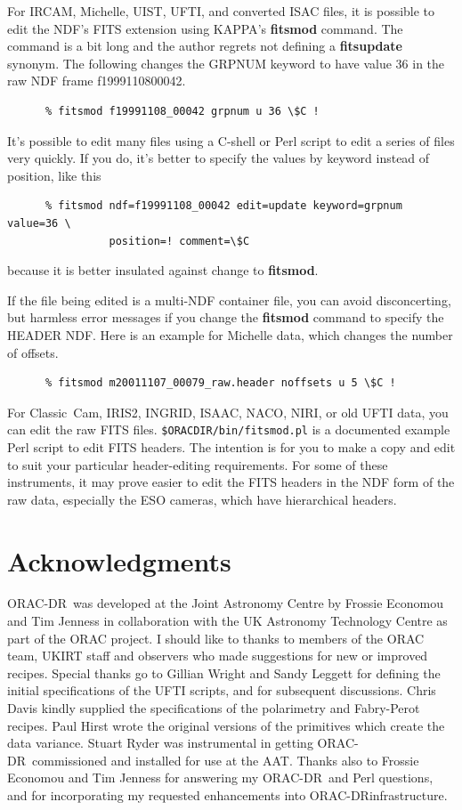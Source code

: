 \documentclass[twoside,11pt]{article}
\newcommand{\xref}[3]{#1}
\renewcommand{\_}{\texttt{\symbol{95}}}
\newcommand{\KAPPA}{{\footnotesize KAPPA}}
\newcommand{\ORACDR}{{\footnotesize ORAC-DR}}
\begin{document}
For IRCAM, Michelle, UIST, UFTI, and converted ISAC files, it is
possible to edit the NDF's
\xref{FITS extension}{sun95}{se_fitsairlock} using \KAPPA's
\xref{{\bf fitsmod}}{sun95}{FITSMOD} command.  The command is a bit
long and the author regrets not defining a {\bf fitsupdate} synonym.
The following changes the GRPNUM keyword to have value 36 in the raw
NDF frame f19991108\_00042.

\begin{verbatim}
      % fitsmod f19991108_00042 grpnum u 36 \$C !
\end{verbatim}

It's possible to edit many files using a \xref{C-shell}{sc4}{} or Perl
script to edit a series of files very quickly.  If you do, it's better
to specify the values by keyword instead of position, like this

\begin{verbatim}
      % fitsmod ndf=f19991108_00042 edit=update keyword=grpnum value=36 \
                position=! comment=\$C
\end{verbatim}
because it is better insulated against change to {\bf fitsmod}.

If the file being edited is a multi-NDF container file, you can avoid
disconcerting, but harmless error messages if you change the {\bf
fitsmod} command to specify the HEADER NDF.  Here is an example for
Michelle data, which changes the number of offsets.

\begin{verbatim}
      % fitsmod m20011107_00079_raw.header noffsets u 5 \$C !
\end{verbatim}

For Classic~Cam, IRIS2, INGRID, ISAAC, NACO, NIRI, or old UFTI data, you can edit
the raw FITS files.  {\tt\$ORAC\_DIR/bin/fitsmod.pl} is a documented
example Perl script to edit FITS headers.  The intention is for you to
make a copy and edit to suit your particular header-editing
requirements.  For some of these instruments, it may prove easier to
edit the FITS headers in the NDF form of the raw data, especially
the ESO cameras, which have hierarchical headers.

\section{Acknowledgments}

\ORACDR\ was developed at the Joint Astronomy Centre by Frossie
Economou and Tim Jenness in collaboration with the UK Astronomy
Technology Centre as part of the ORAC project.  I should like to
thanks to members of the ORAC team, UKIRT staff and observers who made
suggestions for new or improved recipes.  Special thanks go to Gillian
Wright and Sandy Leggett for defining the initial specifications of
the UFTI scripts, and for subsequent discussions.  Chris Davis kindly
supplied the specifications of the polarimetry and Fabry-Perot
recipes.  Paul Hirst wrote the original versions of the primitives
which create the data variance. Stuart Ryder was instrumental in
getting \ORACDR\ commissioned and installed for use at the AAT.
Thanks also to Frossie Economou and Tim Jenness for answering my
\ORACDR\ and Perl questions, and for incorporating my requested
enhancements into \ORACDR infrastructure.
\end{document}
